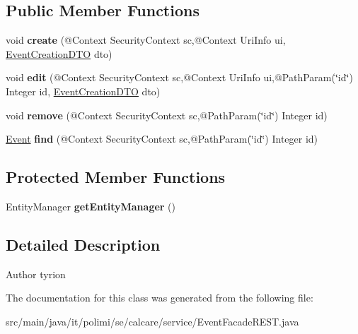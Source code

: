 \subsection*{Public Member Functions}
\begin{DoxyCompactItemize}
\item 
\hypertarget{classit_1_1polimi_1_1se_1_1calcare_1_1service_1_1EventFacadeREST_acc0b1abeab2fbf12f94180b4effda96a}{}void {\bfseries create} (@Context Security\+Context sc,@Context Uri\+Info ui, \hyperlink{classit_1_1polimi_1_1se_1_1calcare_1_1dto_1_1EventCreationDTO}{Event\+Creation\+D\+T\+O} dto)\label{classit_1_1polimi_1_1se_1_1calcare_1_1service_1_1EventFacadeREST_acc0b1abeab2fbf12f94180b4effda96a}

\item 
\hypertarget{classit_1_1polimi_1_1se_1_1calcare_1_1service_1_1EventFacadeREST_adabd62722187873ca23b5689165bafb0}{}void {\bfseries edit} (@Context Security\+Context sc,@Context Uri\+Info ui,@Path\+Param(\char`\"{}id\char`\"{}) Integer id, \hyperlink{classit_1_1polimi_1_1se_1_1calcare_1_1dto_1_1EventCreationDTO}{Event\+Creation\+D\+T\+O} dto)\label{classit_1_1polimi_1_1se_1_1calcare_1_1service_1_1EventFacadeREST_adabd62722187873ca23b5689165bafb0}

\item 
\hypertarget{classit_1_1polimi_1_1se_1_1calcare_1_1service_1_1EventFacadeREST_a1e2228b3dd8b8f1fcdf32f246502941c}{}void {\bfseries remove} (@Context Security\+Context sc,@Path\+Param(\char`\"{}id\char`\"{}) Integer id)\label{classit_1_1polimi_1_1se_1_1calcare_1_1service_1_1EventFacadeREST_a1e2228b3dd8b8f1fcdf32f246502941c}

\item 
\hypertarget{classit_1_1polimi_1_1se_1_1calcare_1_1service_1_1EventFacadeREST_a23370b711d4e6afaf3525f236a08cf49}{}\hyperlink{classit_1_1polimi_1_1se_1_1calcare_1_1entities_1_1Event}{Event} {\bfseries find} (@Context Security\+Context sc,@Path\+Param(\char`\"{}id\char`\"{}) Integer id)\label{classit_1_1polimi_1_1se_1_1calcare_1_1service_1_1EventFacadeREST_a23370b711d4e6afaf3525f236a08cf49}

\end{DoxyCompactItemize}
\subsection*{Protected Member Functions}
\begin{DoxyCompactItemize}
\item 
\hypertarget{classit_1_1polimi_1_1se_1_1calcare_1_1service_1_1EventFacadeREST_ac000259f01de3a74f6e0dc418d7fcae4}{}Entity\+Manager {\bfseries get\+Entity\+Manager} ()\label{classit_1_1polimi_1_1se_1_1calcare_1_1service_1_1EventFacadeREST_ac000259f01de3a74f6e0dc418d7fcae4}

\end{DoxyCompactItemize}


\subsection{Detailed Description}
\begin{DoxyAuthor}{Author}
tyrion 
\end{DoxyAuthor}


The documentation for this class was generated from the following file\+:\begin{DoxyCompactItemize}
\item 
src/main/java/it/polimi/se/calcare/service/Event\+Facade\+R\+E\+S\+T.\+java\end{DoxyCompactItemize}
